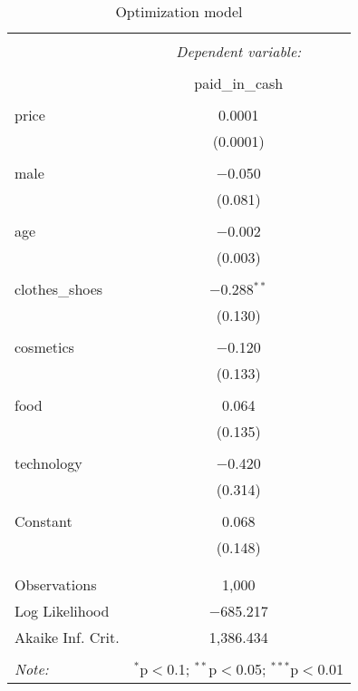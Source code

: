 
\begin{table}[!htbp] \centering 
  \caption{Optimization model} 
  \label{} 
\begin{tabular}{@{\extracolsep{5pt}}lc} 
\\[-1.8ex]\hline 
\hline \\[-1.8ex] 
 & \multicolumn{1}{c}{\textit{Dependent variable:}} \\ 
\cline{2-2} 
\\[-1.8ex] & paid\_in\_cash \\ 
\hline \\[-1.8ex] 
 price & 0.0001 \\ 
  & (0.0001) \\ 
  & \\ 
 male & $-$0.050 \\ 
  & (0.081) \\ 
  & \\ 
 age & $-$0.002 \\ 
  & (0.003) \\ 
  & \\ 
 clothes\_shoes & $-$0.288$^{**}$ \\ 
  & (0.130) \\ 
  & \\ 
 cosmetics & $-$0.120 \\ 
  & (0.133) \\ 
  & \\ 
 food & 0.064 \\ 
  & (0.135) \\ 
  & \\ 
 technology & $-$0.420 \\ 
  & (0.314) \\ 
  & \\ 
 Constant & 0.068 \\ 
  & (0.148) \\ 
  & \\ 
\hline \\[-1.8ex] 
Observations & 1,000 \\ 
Log Likelihood & $-$685.217 \\ 
Akaike Inf. Crit. & 1,386.434 \\ 
\hline 
\hline \\[-1.8ex] 
\textit{Note:}  & \multicolumn{1}{r}{$^{*}$p$<$0.1; $^{**}$p$<$0.05; $^{***}$p$<$0.01} \\ 
\end{tabular} 
\end{table} 
